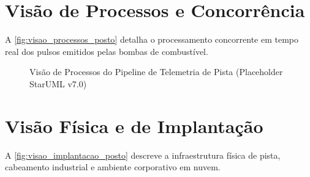 \section{Visão de Processos e Concorrência}

A \autoref{fig:visao_processos_posto} detalha o processamento concorrente em tempo real dos pulsos emitidos pelas bombas de combustível.

\begin{figure}[htbp]
    \centering
    \caption{Visão de Processos do Pipeline de Telemetria de Pista (Placeholder StarUML v7.0)}
    \label{fig:visao_processos_posto}
\end{figure}

\section{Visão Física e de Implantação}

A \autoref{fig:visao_implantacao_posto} descreve a infraestrutura física de pista, cabeamento industrial e ambiente corporativo em nuvem.

